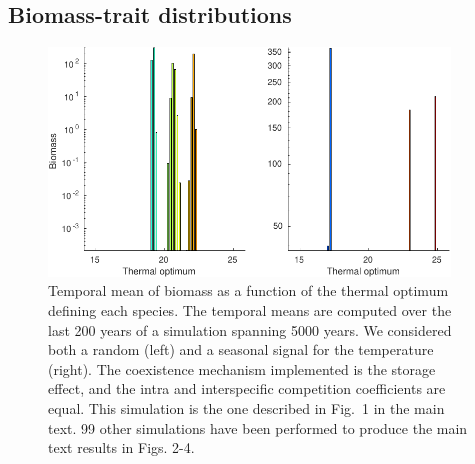 \documentclass[a4paper,12pt]{article}
\begin{document}
\subsection*{Biomass-trait distributions} %
\setcounter{figure}{0}
\renewcommand\thefigure{A\arabic{figure}} 
\begin{figure}[ht!]
\begin{centering}
\includegraphics[width=0.95\textwidth]{FigS1-eps-converted-to.pdf}
\par\end{centering}
\caption{Temporal mean of biomass as a function of the thermal optimum defining
each species. The temporal means are computed over the last 200 years
of a simulation spanning 5000 years. We considered both a random
(left) and a seasonal signal for the temperature (right). The coexistence mechanism
implemented is the storage effect, and the intra and interspecific competition coefficients are equal. This
simulation is the one described in Fig.~1
in the main text\label{fig:Appendix_mean_biomass_iter2}. 99 other simulations
have been performed to produce the main text results in Figs. 2-4. }
\end{figure}
\end{document}
